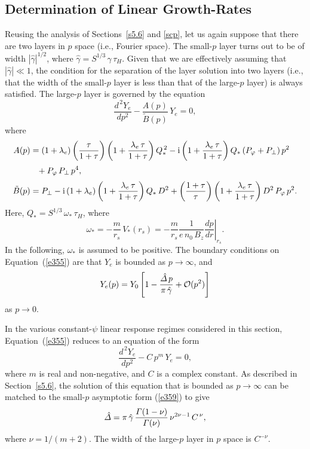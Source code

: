 \documentclass[notitlepage,12pt]{article}
\begin{document}
\subsection{Determination of Linear Growth-Rates}\label{s6.3}
Reusing the analysis of Sections~\ref{s5.6} and \ref{scp}, let us again suppose that there are two layers in $p$ space (i.e., Fourier space). The
small-$p$ layer turns out to be of width $|\hat{\gamma}|^{1/2}$, where $\hat{\gamma} = S^{1/3}\,\gamma\,\tau_H$. Given that we are effectively assuming that
$|\hat{\gamma}|\ll 1$, the condition for the separation of the layer solution into two layers (i.e., that the width of the small-$p$ layer is less than that of the large-$p$ layer) is always satisfied. The large-$p$ layer is governed by the equation
\begin{equation}\label{e355}
\frac{d^{\,2} Y_e}{dp^2} - \frac{A(p)}{\tilde{B}(p)} \,Y_e =0,
\end{equation}
where 
\begin{align}
A(p) &= (1+\lambda_e)\left(\frac{\tau}{1+\tau}\right)\left(1+ \frac{\lambda_e\,\tau}{1+\tau}\right)Q_\ast^{\,2}
-{\rm i}\left(1+\frac{\lambda_e\,\tau}{1+\tau}\right)Q_\ast\,(P_\varphi+P_\perp)\,p^2\nonumber\\[0.5ex]
&\phantom{=} + P_\varphi\,P_\perp\,p^4,\\[0.5ex]
\tilde{B}(p)&= P_\perp - {\rm i}\,(1+\lambda_e)\left(1+\frac{\lambda_e\,\tau}{1+\tau}\right)Q_\ast\,D^2 +\left(\frac{1+\tau}{\tau}\right)\left(1+\frac{\lambda_e\,\tau}{1+\tau}\right) D^2\,P_\varphi\,p^2.
\end{align}
Here, $Q_\ast = S^{1/3}\,\omega_\ast\,\tau_H$, where
\begin{equation}\label{omega}
\omega_\ast = -\frac{m}{r_s}\,V_\ast(r_s)= -\frac{m}{r_s}\frac{1}{e\,n_0\,B_z}\left.\frac{dp}{dr}\right|_{r_s}.
\end{equation}
In the following, $\omega_\ast$ is assumed to be positive. The boundary conditions on Equation~(\ref{e355}) are
that $Y_e$ is bounded as $p\rightarrow\infty$, and
\begin{equation}\label{e359}
Y_e(p)= Y_0\left[1-\frac{\hat{\mit\Delta}\,p}{\pi\,\hat{\gamma}} + {\cal O}(p^2)\right]
\end{equation}
as $p\rightarrow 0$. 

In the various constant-$\psi$ linear response regimes considered in this section, Equation~(\ref{e355}) reduces to an equation of the form
\begin{equation}
\frac{d^{\,2} Y_e}{dp^2} - C\,p^m\,Y_e = 0,
\end{equation}
where $m$ is real and non-negative, and $C$ is a complex constant. As described in Section~\ref{s5.6}, the solution of this
equation that is bounded as $p\rightarrow \infty$ can be matched to the small-$p$ asymptotic form (\ref{e359}) to give 
\begin{equation}
\hat{\mit\Delta} = \pi\,\hat{\gamma}\,\frac{{\mit\Gamma}(1-\nu)}{{\mit\Gamma}(\nu)}\,\nu^{2\nu-1}\,C^{\,\nu},
\end{equation}
where $\nu=1/(m+2)$. The width of the large-$p$ layer in $p$ space is $C^{-\nu}$. 
\end{document}
